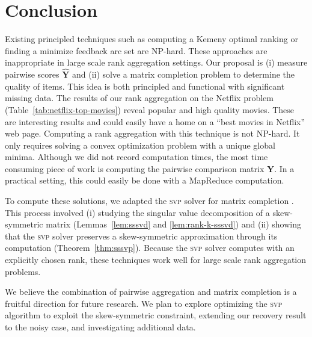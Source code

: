 \documentclass{sig-alternate}
\renewcommand{\cite}{\citep}
\newcommand{\algo}[1]{\textsc{\lowercase{#1}}}
\newcommand{\mat}{\boldsymbol}
\providecommand{\mYhat}{\ensuremath{\mat{\hat{\mY}}}}
\providecommand{\mY}{\ensuremath{\mat{Y}}}
\begin{document}
\section{Conclusion}




Existing principled techniques such
as computing a Kemeny optimal ranking or finding a minimize feedback 
arc set are NP-hard.  These approaches
are inappropriate in large scale rank aggregation settings.
Our proposal is (i) measure pairwise scores $\mYhat$ and (ii)
solve a matrix completion problem to determine the quality
of items.  This idea is both principled and functional with
significant missing data.  The results of our rank aggregation
on the Netflix problem (Table~\ref{tab:netflix-top-movies}) reveal
popular and high quality movies.  These are interesting results
and could easily have a home on a ``best movies in Netflix''
web page.  Computing a rank aggregation
with this technique is not NP-hard.  It only requires
solving a convex optimization problem with a unique global
minima.  Although we did not record computation times,
the most time consuming piece of work is computing the pairwise
comparison matrix $\mY$.  In a practical setting, this could
easily be done with a MapReduce computation.

To compute these solutions, we adapted the \algo{svp} solver
for matrix completion \cite{Jain-2010-SVP}.  This process
involved (i) studying the singular value decomposition of a 
skew-symmetric matrix (Lemmas~\ref{lem:sssvd} and \ref{lem:rank-k-sssvd})
and (ii) showing that the \algo{svp} solver preserves a skew-symmetric
approximation through its computation (Theorem~\ref{thm:sssvp}).
Because the \algo{svp} solver computes with an explicitly chosen rank,
these techniques work well for large scale rank aggregation problems.

We believe the combination of pairwise aggregation and matrix completion
is a fruitful direction for future research.  We
plan to explore optimizing the \algo{svp} algorithm to exploit
the skew-symmetric constraint,
extending our recovery result to the noisy case,
and investigating additional data.


\let\thefootnote\relax
{}

 


\end{document}
